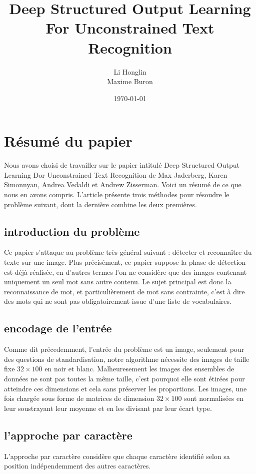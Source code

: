 \documentclass{article}
\author{Li Honglin \\Maxime Buron}
\date{\today}
\title{Deep Structured Output Learning For Unconstrained Text Recognition}
\begin{document}
\maketitle
\tableofcontents
\section{Résumé du papier}
Nous avons choisi de travailler sur le papier intitulé Deep Structured Output Learning Dor Unconstrained Text Recognition de Max Jaderberg, Karen Simonnyan, Andrea Vedaldi et Andrew Zisserman. Voici un résumé de ce que nous en avons compris. L'article présente trois méthodes pour résoudre le problème suivant, dont la dernière combine les deux premières.
\subsection{introduction du problème}
Ce papier s'attaque au problème très général suivant : détecter et reconnaître du texte sur une image. Plus précisément, ce papier suppose la phase de détection est déjà réalisée, en d'autres termes l'on ne considère que des images contenant uniquement un seul mot sans autre contenu. Le sujet principal est donc la reconnaissance de mot, et particulièrement de mot sans contrainte, c'est à dire des mots qui ne sont pas obligatoirement issue d'une liste de vocabulaires.

\subsection{encodage de l'entrée}
Comme dit précedemment, l'entrée du problème est un image, seulement pour des questions de standardisation, notre algorithme nécessite des images de taille fixe $32\times100$ en noir et blanc. Malheuresement les images des ensembles de données ne sont pas toutes la même taille, c'est pourquoi elle sont étirées pour atteindre ces dimensions et cela sans préserver les proportions. Les images, une fois chargée sous forme de matrices de dimension $32 \times 100$ sont normalisées en leur soustrayant leur moyenne et en les divisant par leur écart type. 

\subsection{l'approche par caractère}
L'approche par caractère considère que chaque caractère identifié selon sa position indépendemment des autres caractères. 
\end{document}
